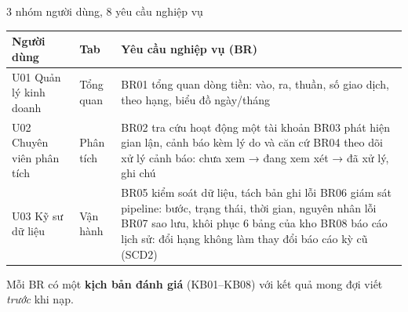 \documentclass[aspectratio=169,11pt]{beamer}
\begin{document}
\begin{frame}{3 nhóm người dùng, 8 yêu cầu nghiệp vụ}
  \footnotesize
  \begin{tabular}{L{2.3cm} L{1.4cm} L{8.9cm}}
    \toprule
    \textbf{Người dùng} & \textbf{Tab} & \textbf{Yêu cầu nghiệp vụ (BR)} \\
    \midrule
    U01 Quản lý kinh doanh & Tổng quan & BR01 tổng quan dòng tiền: vào, ra, thuần, số giao dịch, theo hạng, biểu đồ ngày/tháng \\
    \midrule
    U02 Chuyên viên phân tích & Phân tích & BR02 tra cứu hoạt động một tài khoản \newline
      BR03 phát hiện gian lận, cảnh báo kèm lý do và căn cứ \newline
      BR04 theo dõi xử lý cảnh báo: chưa xem → đang xem xét → đã xử lý, ghi chú \\
    \midrule
    U03 Kỹ sư dữ liệu & Vận hành & BR05 kiểm soát dữ liệu, tách bản ghi lỗi \newline
      BR06 giám sát pipeline: bước, trạng thái, thời gian, nguyên nhân lỗi \newline
      BR07 sao lưu, khôi phục 6 bảng của kho \newline
      BR08 báo cáo lịch sử: đổi hạng không làm thay đổi báo cáo kỳ cũ (SCD2) \\
    \bottomrule
  \end{tabular}
  \medskip

  \small Mỗi BR có một \textbf{kịch bản đánh giá} (KB01--KB08) với kết quả mong đợi viết \emph{trước} khi nạp.
\end{frame}
\end{document}
